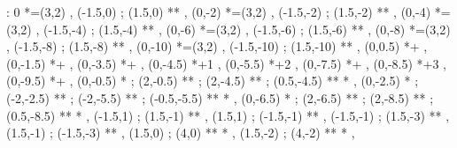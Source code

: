 \documentclass[a4paper,12pt]{article}
\newcommand{\actionsym}[1]{{\mbox{\color{Emerald}{\{$#1$\}}}}}
\begin{document}
\begin{table}[hbtp]

\xy <1cm,0cm>:
0 *=(3,2)\frm{-} ,
(-1.5,0) ; (1.5,0) **\dir{--} ,
(0,-2) *=(3,2)\frm{-} ,
(-1.5,-2) ; (1.5,-2) **\dir{--} ,
(0,-4) *=(3,2)\frm{-} ,
(-1.5,-4) ; (1.5,-4) **\dir{--} ,
(0,-6) *=(3,2)\frm{-} ,
(-1.5,-6) ; (1.5,-6) **\dir{--} ,
(0,-8) *=(3,2)\frm{-} ,
(-1.5,-8) ; (1.5,-8) **\dir{--} ,
(0,-10) *=(3,2)\frm{-} ,
(-1.5,-10) ; (1.5,-10) **\dir{--} ,
\POS (0,0.5) *+{\actionsym{E}} ,
\POS (0,-1.5) *+{\actionsym{E}} ,
\POS (0,-3.5) *+{\actionsym{ADD}} ,
\POS (0,-4.5) *+{1} ,
\POS (0,-5.5) *+{2} ,
\POS (0,-7.5) *+{\actionsym{ANSWER}} ,
\POS (0,-8.5) *+{3} ,
\POS (0,-9.5) *+{\triangledown} ,
(0,-0.5) *{\bullet} ; (2,-0.5) **\dir{-} ;
(2,-4.5) **\dir{-} ;
(0.5,-4.5) **\dir{-} *\dir{>} ,
(0,-2.5) *{\bullet} ; (-2,-2.5) **\dir{-} ;
(-2,-5.5) **\dir{-} ;
(-0.5,-5.5) **\dir{-} *\dir{>} ,
(0,-6.5) *{\bullet} ; (2,-6.5) **\dir{-} ;
(2,-8.5) **\dir{-} ;
(0.5,-8.5) **\dir{-} *\dir{>} ,
(-1.5,1) ; (1.5,-1) **\dir{-} ,
(1.5,1) ; (-1.5,-1) **\dir{-} ,
(-1.5,-1) ; (1.5,-3) **\dir{-} ,
(1.5,-1) ; (-1.5,-3) **\dir{-} ,
(1.5,0) ; (4,0) **\dir{-} *\dir{>} ,
(1.5,-2) ; (4,-2) **\dir{-} *\dir{>} ,
\endxy

\end{table}
\end{document}
